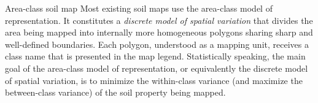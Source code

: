 Area-class soil map
Most existing soil maps use the area-class model of representation. It 
constitutes a \emph{discrete model of spatial variation} that divides the area being mapped into 
internally more homogeneous polygons sharing sharp and well-defined boundaries. Each polygon, 
understood as a mapping unit, receives a class name that is presented in the map legend. 
Statistically speaking, the main goal of the area-class model of representation, or equivalently 
the discrete model of spatial variation, is to minimize the within-class variance (and maximize 
the between-class variance) of the soil property being mapped.
